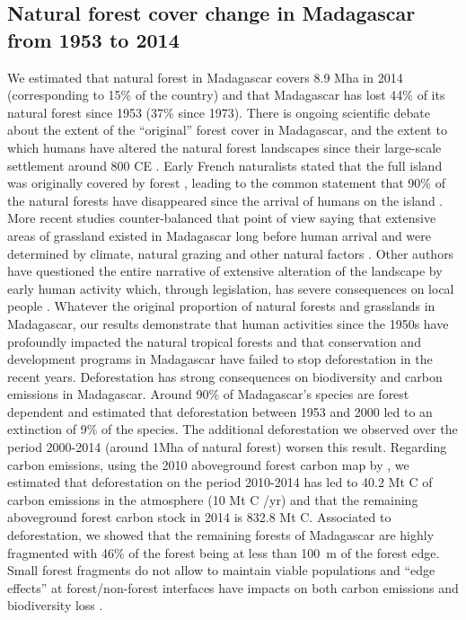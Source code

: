 \documentclass[a4paper, 12pt, leqno]{article}\usepackage[]{graphicx}\usepackage[]{color}
\begin{document}
\subsection{Natural forest cover change in Madagascar from 1953 to 2014}

We estimated that natural forest in Madagascar covers 8.9 Mha in 2014
(corresponding to 15\% of the country) and that Madagascar has lost
44\% of its natural forest since 1953 (37\% since 1973). There is
ongoing scientific debate about the extent of the ``original'' forest
cover in Madagascar, and the extent to which humans have altered the
natural forest landscapes since their large-scale settlement around
800 CE \citep{Burns2016, Cox2012}. Early French naturalists stated
that the full island was originally covered by forest
\citep{Humbert1927, Perrier1921}, leading to the common statement that
90\% of the natural forests have disappeared since the arrival of
humans on the island \citep{Kull2000}. More recent studies
counter-balanced that point of view saying that extensive areas of
grassland existed in Madagascar long before human arrival and were
determined by climate, natural grazing and other natural factors
\citep{Vorontsova2017, Virah-Sawmy2009}. Other authors have questioned
the entire narrative of extensive alteration of the landscape by early
human activity which, through legislation, has severe consequences on
local people \citep{Klein2002, Kull2000}. Whatever the original
proportion of natural forests and grasslands in Madagascar, our
results demonstrate that human activities since the 1950s have
profoundly impacted the natural tropical forests and that conservation
and development programs in Madagascar have failed to stop
deforestation in the recent years. Deforestation has strong
consequences on biodiversity and carbon emissions in
Madagascar. Around 90\% of Madagascar's species are forest dependent
\citep{Allnutt2008, Goodman2005} and \citet{Allnutt2008} estimated
that deforestation between 1953 and 2000 led to an extinction of 9\%
of the species. The additional deforestation we observed over the
period 2000-2014 (around 1Mha of natural forest) worsen this
result. Regarding carbon emissions, using the 2010 aboveground forest
carbon map by \citet{Vieilledent2016}, we estimated that deforestation
on the period 2010-2014 has led to 40.2 Mt C of carbon emissions in
the atmosphere (10 Mt C /yr) and that the remaining aboveground forest
carbon stock in 2014 is 832.8 Mt C. Associated to deforestation, we
showed that the remaining forests of Madagascar are highly fragmented
with 46\% of the forest being at less than 100~m of the forest
edge. Small forest fragments do not allow to maintain viable
populations and ``edge effects'' at forest/non-forest interfaces have
impacts on both carbon emissions \citep{Brinck2017} and biodiversity
loss \citep{Gibson2013, Murcia1995}.
\end{document}
